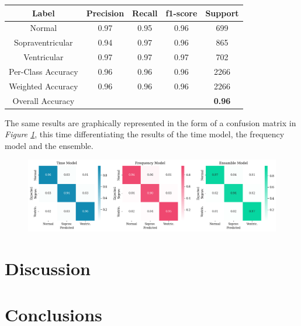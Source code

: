 \documentclass[conference]{IEEEtran}
\newcommand{\fig}[1]{\textit{Figure \ref{#1}}}
\begin{document}
    \begin{center}
        \begin{tabular}{||c|c c c c||}
            \hline
            Label & Precision & Recall & f1-score & Support\\
            \hline \hline
        
            Normal& 0.97&0.95&0.96&699\\
            \hline
            Sopraventricular& 0.94&0.97&0.96&865\\
            \hline
            Ventricular& 0.97&0.97&0.97&702\\
            \hline\hline
        
            Per-Class Accuracy &0.96&0.96&0.96&2266\\
            \hline
            Weighted Accuracy &0.96&0.96&0.96&2266\\
            \hline
            Overall Accuracy&&&&\textbf{0.96}\\
            \hline
        \end{tabular}
    \end{center}

    The same results are graphically represented in the form of a confusion
    matrix in \fig{fig:confmat}, this time differentiating the results of the
    time model, the frequency model and the ensemble.

    \begin{figure}
        \centering
        \includegraphics[width=\linewidth]{img/confmatr.png}
        \caption{}
        \label{fig:confmat}
    \end{figure}
    
\section{Discussion}

\section{Conclusions}



\end{document}
